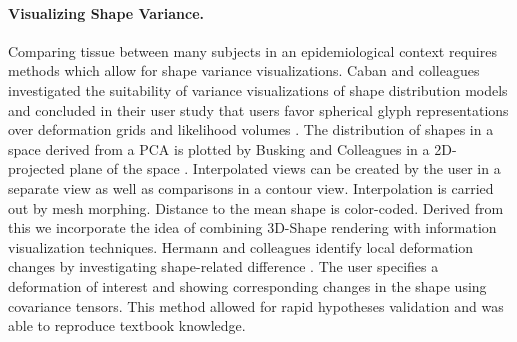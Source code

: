 \documentclass[journal]{style/vgtc} 			          %
\begin{document}
\paragraph{Visualizing Shape Variance.}
Comparing tissue between many subjects in an epidemiological context requires methods which allow for shape variance visualizations.
%
Caban and colleagues investigated the suitability of variance visualizations of shape distribution models and concluded in their user study that users favor spherical glyph representations over deformation grids and likelihood volumes \cite{Caban2011}.
%
The distribution of shapes in a space derived from a PCA is plotted by Busking and Colleagues in a 2D-projected plane of the space \cite{Busking2010a}.
%
Interpolated views can be created by the user in a separate view as well as comparisons in a contour view.
%
Interpolation is carried out by mesh morphing.
%
Distance to the mean shape is color-coded.
%
Derived from this we incorporate the idea of combining 3D-Shape rendering with information visualization techniques.
%
%
%
Hermann and colleagues identify local deformation changes by investigating shape-related difference \cite{Hermann2014}. 
%
The user specifies a deformation of interest and showing corresponding changes in the shape using covariance tensors.
%
This method allowed for rapid hypotheses validation and was able to reproduce textbook knowledge.
%
%
%

\end{document}
